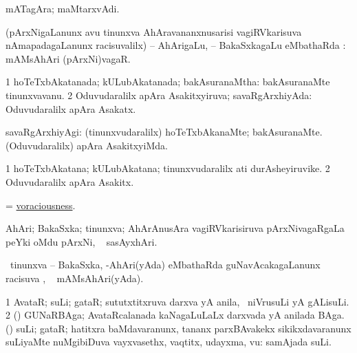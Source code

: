 \bentry 
{} 
\gl{\nA}
\expl{}
\bmng
 mATagAra; maMtarxvAdi. 
\emng
\eentry

\bentry 
{} 
\gl{\saupa}
\expl{}
\bmng
 (pArxNigaLanunx avu tinunxva AhAravananxnusarisi vagiRVkarisuva nAmapadagaLanunx racisuvalilx) -- AhArigaLu, -- BakaSxkagaLu eMbathaRda \saupa :  mAMsAhAri (pArxNi)vagaR. 
\emng
\eentry

\bentry
{} 
\gl{\gu}
\expl{}
\bmng
\bnum
\num{1} hoTeTxbAkatanada; kULubAkatanada; bakAsuranaMtha:  bakAsuranaMte tinunxvavanu. 
\num{2} Oduvudaralilx apAra Asakitxyiruva; savaRgArxhiyAda:  Oduvudaralilx apAra Asakatx. 
\enum
\emng
\eentry

\bentry
{} 
\gl{\kirxvi}
\expl{}
\bmng
savaRgArxhiyAgi: 
\banum
{} (tinunxvudaralilx) hoTeTxbAkanaMte; bakAsuranaMte. 
 (Oduvudaralilx) apAra AsakitxyiMda. 
\eanum
\emng
\eentry

\bentry 
{} 
\gl{\nA}
\expl{}
\bmng
\bnum
\num{1} hoTeTxbAkatana; kULubAkatana; tinunxvudaralilx ati durAsheyiruvike. 
\num{2} Oduvudaralilx apAra Asakitx. 
\enum
\emng
\eentry

\bentry 
{} 
\gl{\nA}
\expl{}
\bmng
 = \hyperlink{voraciousness}{voraciousness}. 
\emng
\eentry

\bentry
{} 
\gl{\saupa}
\expl{}
\bmng
 \eng{-} AhAri; \eng{-} BakaSxka; \eng{-} tinunxva; AhArAnusAra vagiRVkarisiruva pArxNivagaRgaLa peYki oMdu pArxNi, \udA\  sasAyxhAri. 
\emng
\eentry

\bentry
{} 
\gl{\saupa}
\expl{}
\bmng
 \sA\ tinunxva -- BakaSxka, -AhAri(yAda) eMbathaRda guNavAcakagaLanunx racisuva \saupa , \udA\  mAMsAhAri(yAda). 
\emng
\eentry

\bentry
{} 
\gl{\nA}
\bmng
\bnum
\num{1} AvataR; suLi; gataR; sututxtitxruva darxva yA anila, \kanmu\ niVrusuLi yA gALisuLi. 
\num{2} (\Bwvi) GUNaRBAga; AvataRcalanada kaNagaLuLaLx darxvada yA anilada BAga. (\rUpa) suLi; gataR; hatitxra baMdavaranunx, tananx parxBAvakekx sikikxdavaranunx suLiyaMte nuMgibiDuva vayxvasethx, vaqtitx, udayxma, \mo vu:  samAjada suLi. 
\enum
\emng
\eentry
 

